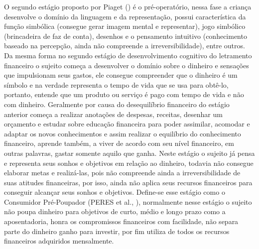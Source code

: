 O segundo estágio proposto por Piaget (\citeyear{piaget1971}) é o pré-operatório, nessa fase a criança desenvolve o domínio da linguagem e da representação, possui característica da função simbólica (consegue gerar imagem mental e representar), jogo simbólico (brincadeira de faz de conta), desenhos e o pensamento intuitivo (conhecimento baseado na percepção, ainda não compreende a irreversibilidade), entre outros. Da mesma forma no segundo estágio de desenvolvimento cognitivo do letramento financeiro o sujeito começa a desenvolver o domínio sobre o dinheiro e sensações que impulsionam seus gastos, ele consegue compreender que o dinheiro é um símbolo e na verdade representa o tempo de vida que se usa para obtê-lo, portanto, entende que um produto ou serviço é pago com tempo de vida e não com dinheiro. Geralmente por causa do desequilíbrio financeiro do estágio anterior começa a realizar anotações de despesas, receitas, desenhar um orçamento e estudar sobre educação financeira para poder assimilar, acomodar e adaptar os novos conhecimentos e assim realizar o equilíbrio do conhecimento financeiro, aprende também, a viver de acordo com seu nível financeiro, em outras palavras, gastar somente aquilo que ganha. Neste estágio o sujeito já pensa e representa seus sonhos e objetivos em relação ao dinheiro, todavia não consegue elaborar metas e realizá-las, pois não compreende ainda a irreversibilidade de suas atitudes financeiras, por isso, ainda não aplica seus recursos financeiros para conseguir alcançar seus sonhos e objetivos. Define-se esse estágio como o Consumidor Pré-Poupador (PERES et al., \citeyear{peres2019}), normalmente nesse estágio o sujeito não poupa dinheiro para objetivos de curto, médio e longo prazo como a aposentadoria, honra os compromissos financeiros com facilidade, não separa parte do dinheiro ganho para investir, por fim utiliza de todos os recursos financeiros adquiridos mensalmente.

